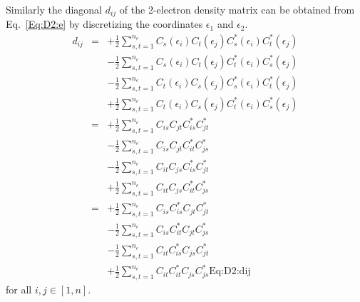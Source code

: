 \documentclass[pra,nofootinbib]{revtex4-1}
\newcommand{\nel}{{n_{e}}}
\newcommand{\dlabel}[1]{\text{#1}\label{#1}}
\begin{document}
Similarly the diagonal $d_{ij}$ of the 2-electron density matrix can be obtained from Eq.~\ref{Eq:D2:e}
by discretizing the coordinates $\epsilon_1$ and $\epsilon_2$. 
\begin{eqnarray}
   d_{ij}
   &=&+\frac{1}{2}\sum_{s,t=1}^{\nel} C_s(\epsilon_i)C_t(\epsilon_j) 
                                      C_s^*(\epsilon_i)C_t^*(\epsilon_j) \nonumber \\
   &&- \frac{1}{2}\sum_{s,t=1}^{\nel} C_s(\epsilon_i)C_t(\epsilon_j) 
                                      C_t^*(\epsilon_i)C_s^*(\epsilon_j) \nonumber \\
   &&- \frac{1}{2}\sum_{s,t=1}^{\nel} C_t(\epsilon_i)C_s(\epsilon_j) 
                                      C_s^*(\epsilon_i)C_t^*(\epsilon_j) \nonumber \\
   &&+ \frac{1}{2}\sum_{s,t=1}^{\nel} C_t(\epsilon_i)C_s(\epsilon_j) 
                                      C_t^*(\epsilon_i)C_s^*(\epsilon_j) \\
   &=&+\frac{1}{2}\sum_{s,t=1}^{\nel} C_{is}C_{jt} C_{is}^*C_{jt}^* \nonumber \\
   &&- \frac{1}{2}\sum_{s,t=1}^{\nel} C_{is}C_{jt} C_{it}^*C_{js}^* \nonumber \\
   &&- \frac{1}{2}\sum_{s,t=1}^{\nel} C_{it}C_{js} C_{is}^*C_{jt}^* \nonumber \\
   &&+ \frac{1}{2}\sum_{s,t=1}^{\nel} C_{it}C_{js} C_{it}^*C_{js}^* \\
   &=&+\frac{1}{2}\sum_{s,t=1}^{\nel} C_{is}C_{is}^* C_{jt}C_{jt}^* \nonumber \\
   &&- \frac{1}{2}\sum_{s,t=1}^{\nel} C_{is}C_{it}^* C_{jt}C_{js}^* \nonumber \\
   &&- \frac{1}{2}\sum_{s,t=1}^{\nel} C_{it}C_{is}^* C_{js}C_{jt}^* \nonumber \\
   &&+ \frac{1}{2}\sum_{s,t=1}^{\nel} C_{it}C_{it}^* C_{js}C_{js}^* \dlabel{Eq:D2:dij}
\end{eqnarray}
for all $i,j \in [1,n]$.
\end{document}
